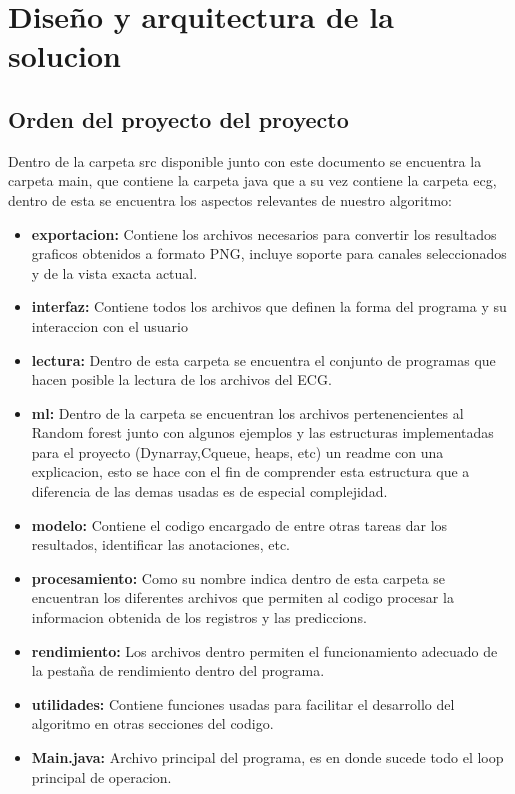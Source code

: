 \section{Diseño y arquitectura de la solucion}
\label{sec:diseño}

\subsection{Orden del proyecto del proyecto}
Dentro de la carpeta src disponible junto con este documento se encuentra la carpeta main, que contiene la carpeta java que a su vez contiene la carpeta ecg, dentro de esta se encuentra los aspectos relevantes de nuestro algoritmo:
\begin{itemize}
    \item \textbf{exportacion:} Contiene los archivos necesarios para convertir los resultados graficos obtenidos a formato PNG, incluye soporte para canales seleccionados y de la vista exacta actual.
    \item \textbf{interfaz:} Contiene todos los archivos que definen la forma del programa y su interaccion con el usuario
    \item \textbf{lectura:} Dentro de esta carpeta se encuentra el conjunto de programas que hacen posible la lectura de los archivos del ECG.
    \item \textbf{ml:} Dentro de la carpeta se encuentran los archivos pertenencientes al Random forest junto con algunos ejemplos y las estructuras implementadas para el proyecto (Dynarray,Cqueue, heaps, etc) un readme con una explicacion, esto se hace con el fin de comprender esta estructura que a diferencia de las demas usadas es de especial complejidad.
    \item \textbf{modelo:} Contiene el codigo encargado de entre otras tareas dar los resultados, identificar las anotaciones, etc.
    \item \textbf{procesamiento:} Como su nombre indica dentro de esta carpeta se encuentran los diferentes archivos que permiten al codigo procesar la informacion obtenida de los registros y las prediccions.
    \item \textbf{rendimiento:} Los archivos dentro permiten el funcionamiento adecuado de la pestaña de rendimiento dentro del programa.
    \item \textbf{utilidades:} Contiene funciones usadas para facilitar el desarrollo del algoritmo en otras secciones del codigo.
    \item \textbf{Main.java:} Archivo principal del programa, es en donde sucede todo el loop principal de operacion.
\end{itemize}

